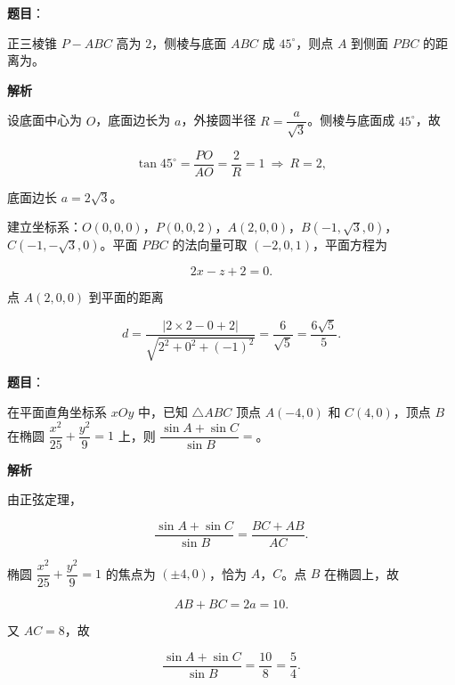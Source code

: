 \begin{answer}

\textbf{题目}：

正三棱锥 $P-ABC$ 高为 $2$，侧棱与底面 $ABC$ 成 $45^\circ$，则点 $A$ 到侧面 $PBC$ 的距离为\gkblank{}。

\textbf{解析}

设底面中心为 $O$，底面边长为 $a$，外接圆半径 $R=\dfrac{a}{\sqrt3}$。侧棱与底面成 $45^\circ$，故

\nopagebreak[4]
\[\tan45^\circ=\frac{PO}{AO}=\frac{2}{R}=1\ \Rightarrow\ R=2,\]

底面边长 $a=2\sqrt3$。

建立坐标系：$O(0,0,0)$，$P(0,0,2)$，$A(2,0,0)$，$B(-1,\sqrt3,0)$，$C(-1,-\sqrt3,0)$。平面 $PBC$ 的法向量可取 $(-2,0,1)$，平面方程为

\nopagebreak[4]
\[2x-z+2=0.\]

点 $A(2,0,0)$ 到平面的距离

\nopagebreak[4]
\[d=\frac{|2\times2-0+2|}{\sqrt{2^2+0^2+(-1)^2}}=\frac{6}{\sqrt5}=\frac{6\sqrt5}{5}.\]


\end{answer}
\begin{answer}

\textbf{题目}：

在平面直角坐标系 $xOy$ 中，已知 $\triangle ABC$ 顶点 $A(-4,0)$ 和 $C(4,0)$，顶点 $B$ 在椭圆 $\dfrac{x^2}{25}+\dfrac{y^2}{9}=1$ 上，则 $\dfrac{\sin A+\sin C}{\sin B}=$\gkblank{}。

\textbf{解析}

由正弦定理，

\nopagebreak[4]
\[\frac{\sin A+\sin C}{\sin B}=\frac{BC+AB}{AC}.\]

椭圆 $\dfrac{x^2}{25}+\dfrac{y^2}{9}=1$ 的焦点为 $(\pm4,0)$，恰为 $A$，$C$。点 $B$ 在椭圆上，故

\nopagebreak[4]
\[AB+BC=2a=10.\]

又 $AC=8$，故

\nopagebreak[4]
\[\frac{\sin A+\sin C}{\sin B}=\frac{10}{8}=\frac54.\]


\end{answer}

